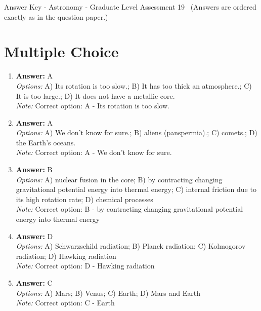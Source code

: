 \documentclass[12pt]{article}
\begin{document}
\begin{center}
Answer Key - Astronomy - Graduate Level Assessment 19 \
\small (Answers are ordered exactly as in the question paper.)
\end{center}

\section*{Multiple Choice}
\begin{enumerate}[label=\arabic*.]
\item \textbf{Answer:} A
\\ \textit{Options:} A) Its rotation is too slow.; B) It has too thick an atmosphere.; C) It is too large.; D) It does not have a metallic core.
\\ \textit{Note:} Correct option: A - Its rotation is too slow.
\item \textbf{Answer:} A
\\ \textit{Options:} A) We don't know for sure.; B) aliens (panspermia).; C) comets.; D) the Earth's oceans.
\\ \textit{Note:} Correct option: A - We don't know for sure.
\item \textbf{Answer:} B
\\ \textit{Options:} A) nuclear fusion in the core; B) by contracting changing gravitational potential energy into thermal energy; C) internal friction due to its high rotation rate; D) chemical processes
\\ \textit{Note:} Correct option: B - by contracting changing gravitational potential energy into thermal energy
\item \textbf{Answer:} D
\\ \textit{Options:} A) Schwarzschild radiation; B) Planck radiation; C) Kolmogorov radiation; D) Hawking radiation
\\ \textit{Note:} Correct option: D - Hawking radiation
\item \textbf{Answer:} C
\\ \textit{Options:} A) Mars; B) Venus; C) Earth; D) Mars and Earth
\\ \textit{Note:} Correct option: C - Earth
\end{enumerate}
\end{document}
